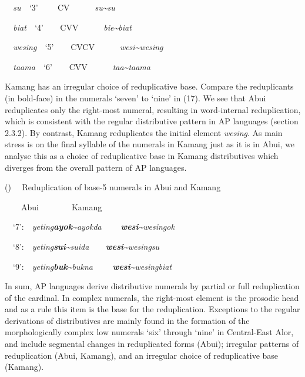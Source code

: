 \textit{\ \ su\ \ }{\textquoteleft}3{\textquoteright}\textit{  \ \ \ \ }CV\textit{\ \ \ \ \ \ su\~{}su}

\textit{\ \ biat\ \ }{\textquoteleft}4{\textquoteright}\ \ \textit{\ \ }CVV\textit{\ \ \ \ \ \ bie\~{}biat}

\textit{\ \ wesing\ \ }{\textquoteleft}5{\textquoteright}\textit{\ \ \ \ }CVCV\textit{\ \ \ \ \ \ wesi\~{}wesing}

\textit{\ \ taama\ \ }{\textquoteleft}6{\textquoteright}\textit{\ \ \ \ }CVV\textit{\ \ \ \ \ \ taa\~{}taama}

Kamang has an irregular choice of reduplicative base. Compare the reduplicants (in bold-face) in the numerals {\textquoteleft}seven{\textquoteright} to {\textquoteleft}nine{\textquoteright} in (17). We see that Abui reduplicates only the right-most numeral, resulting in word-internal reduplication, which is consistent with the regular distributive pattern in AP languages (section 2.3.2). By contrast, Kamang reduplicates the initial element \textit{wesing}. As main stress is on the final syllable of the numerals in Kamang just as it is in Abui, we analyse this as a choice of reduplicative base in Kamang distributives which diverges from the overall pattern of AP languages. 

() \ \ Reduplication of base-5 numerals in Abui and Kamang

\ \ \ \ Abui\ \ \ \ \ \ \ \ Kamang

\ \ {\textquoteleft}7{\textquoteright}:\ \ \textit{yeting}\textbf{\textit{ayok}}\textit{\~{}ayokda} \ \ \ \ \textbf{\textit{wesi}}\textit{\~{}wesingok}

\ \ {\textquoteleft}8{\textquoteright}:\ \ \textit{yeting}\textbf{\textit{sui}}\textit{\~{}suida\ \ \ \ }\textbf{\textit{wesi}}\textit{\~{}wesingsu}

\ \ {\textquoteleft}9{\textquoteright}:\ \ \textit{yeting}\textbf{\textit{buk}}\textit{\~{}bukna \ \ \ \ }\textbf{\textit{wesi}}\textit{\~{}wesingbiat}

In sum, AP languages derive distributive numerals by partial or full reduplication of the cardinal. In complex numerals, the right-most element is the prosodic head and as a rule this item is the base for the reduplication. Exceptions to the regular derivations of distributives are mainly found in the formation of the morphologically complex low numerals {\textquoteleft}six{\textquoteright} through {\textquoteleft}nine{\textquoteright} in Central-East Alor, and include segmental changes in reduplicated forms (Abui); irregular patterns of reduplication (Abui, Kamang), and an irregular choice of reduplicative base (Kamang). 

